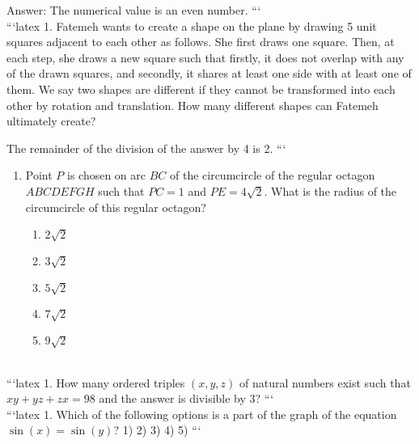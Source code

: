 Answer: The numerical value is an even number.
```
\\
```latex
1. Fatemeh wants to create a shape on the plane by drawing 5 unit squares adjacent to each other as follows. She first draws one square. Then, at each step, she draws a new square such that firstly, it does not overlap with any of the drawn squares, and secondly, it shares at least one side with at least one of them. We say two shapes are different if they cannot be transformed into each other by rotation and translation. How many different shapes can Fatemeh ultimately create?

The remainder of the division of the answer by 4 is 2.
```
\\
\begin{enumerate}
    \item Point $P$ is chosen on arc $BC$ of the circumcircle of the regular octagon $ABCDEFGH$ such that $PC = 1$ and $PE = 4\sqrt{2}$. What is the radius of the circumcircle of this regular octagon?
    \begin{enumerate}
        \item $2\sqrt{2}$
        \item $3\sqrt{2}$
        \item $5\sqrt{2}$
        \item $7\sqrt{2}$
        \item $9\sqrt{2}$
    \end{enumerate}
\end{enumerate}
\\
```latex
1. How many ordered triples $(x, y, z)$ of natural numbers exist such that $xy + yz + zx = 98$ and the answer is divisible by 3?
```
\\
```latex
1. Which of the following options is a part of the graph of the equation $\sin(x) = \sin(y)$? 
1) 
2) 
3) 
4) 
5) 
```

